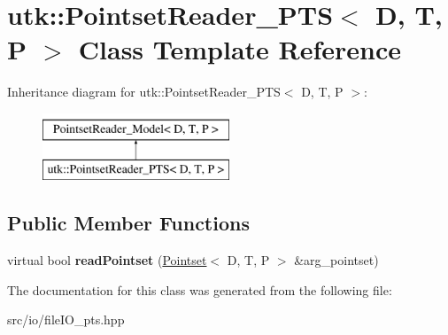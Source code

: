 \hypertarget{classutk_1_1PointsetReader__PTS}{\section{utk\-:\-:Pointset\-Reader\-\_\-\-P\-T\-S$<$ D, T, P $>$ Class Template Reference}
\label{classutk_1_1PointsetReader__PTS}
}
Inheritance diagram for utk\-:\-:Pointset\-Reader\-\_\-\-P\-T\-S$<$ D, T, P $>$\-:\begin{figure}[H]
\begin{center}
\leavevmode
\includegraphics[height=2.000000cm]{classutk_1_1PointsetReader__PTS}
\end{center}
\end{figure}
\subsection*{Public Member Functions}
\begin{DoxyCompactItemize}
\item 
\hypertarget{classutk_1_1PointsetReader__PTS_a64e56c8bfdc9e15a474d83d5911e67a4}{virtual bool {\bfseries read\-Pointset} (\hyperlink{classutk_1_1Pointset}{Pointset}$<$ D, T, P $>$ \&arg\-\_\-pointset)}\label{classutk_1_1PointsetReader__PTS_a64e56c8bfdc9e15a474d83d5911e67a4}

\end{DoxyCompactItemize}


The documentation for this class was generated from the following file\-:\begin{DoxyCompactItemize}
\item 
src/io/file\-I\-O\-\_\-pts.\-hpp\end{DoxyCompactItemize}
